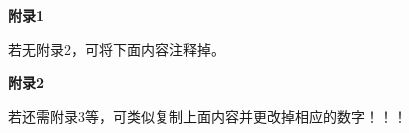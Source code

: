 \newpage
{}
{\noindent{}\bf\vspace{0.5\baselineskip}附录1\vspace{0.5\baselineskip}}\par
若无附录2，可将下面内容注释掉。


\newpage
{}
{\noindent{}\bf\vspace{0.5\baselineskip}附录2\vspace{0.5\baselineskip}}\par
若还需附录3等，可类似复制上面内容并更改掉相应的数字！！！